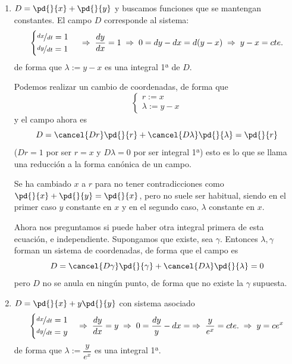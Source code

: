     \begin{eje} \:
        \begin{enumerate} 
            \item $D=\pd{}{x}+\pd{}{y}$ y buscamos funciones que se mantengan constantes. El campo $D$ corresponde al sistema: $$\begin{cases}
                \nicefrac{dx}{dt}=1 \\ \nicefrac{dy}{dt}=1
            \end{cases} \; \Rightarrow \; \dfrac{dy}{dx}=1 \; \Rightarrow \; 0=dy-dx=d(y-x)  \; \Rightarrow \; y-x=cte. $$
            de forma que $\lambda:=y-x$ es una integral 1ª de $D$. 
            
            Podemos realizar un cambio de coordenadas, de forma que 
            $$\left\{\begin{array}{l}
                 r:=x  \\
                 \lambda:= y-x
            \end{array} \right.$$
            y el campo ahora es
            $$D=\cancel{Dr}\pd{}{r}+\cancel{D\lambda} \pd{}{\lambda}=\pd{}{r}$$
            ($Dr=1$ por ser $r=x$ y $D\lambda=0$ por ser integral 1ª)
            esto es lo que se llama una reducción a la forma canónica de un campo.
            \begin{obs}
                Se ha cambiado $x$ a $r$ para no tener contradicciones como $\pd{}{x}+\pd{}{y}=\pd{}{x}$, pero no suele ser habitual, siendo en el primer caso $y$ constante en $x$ y en el segundo caso, $\lambda$ constante en $x$.
            \end{obs}
            Ahora nos preguntamos si puede haber otra integral primera de esta ecuación, e independiente. Supongamos que existe, sea $\gamma$. Entonces $\lambda, \gamma$ forman un sistema de coordenadas, de forma que el campo es 
            $$D=\cancel{D\gamma}\pd{}{\gamma}+\cancel{D\lambda} \pd{}{\lambda}=0$$
            pero $D$ no se anula en ningún punto, de forma que no existe la $\gamma$ supuesta.

            \item $D=\pd{}{x}+y\pd{}{y}$ con sistema asociado
            $$\begin{cases}
                \nicefrac{dx}{dt}=1 \\ \nicefrac{dy}{dt}=y
            \end{cases}  \Rightarrow \; \dfrac{dy}{dx}=y \; \Rightarrow \; 0=\dfrac{dy}{y}-dx=  \; \Rightarrow \; \dfrac{y}{e^x}=cte. \; \Rightarrow \; y=ce^x $$
            de forma que $\lambda:= \dfrac{y}{e^x}$ es una integral 1ª.


\end{enumerate}
\end{eje}

